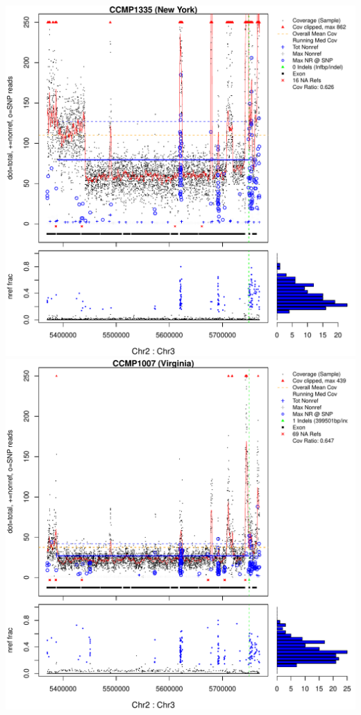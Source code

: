 \documentclass{article}\usepackage[]{graphicx}\usepackage[]{color}
\makeatletter
\def\maxwidth{ %
  \ifdim\Gin@nat@width>\linewidth
    \linewidth
  \else
    \Gin@nat@width
  \fi
}
\newenvironment{knitrout}{}{} %
\makeatother
\begin{document}
\begin{knitrout}
{\centering \includegraphics[width=\maxwidth]{figs-knitr/unnamed-chunk-37-1} 
\includegraphics[width=\maxwidth]{figs-knitr/unnamed-chunk-37-2} 
}
\end{knitrout}
\end{document}
